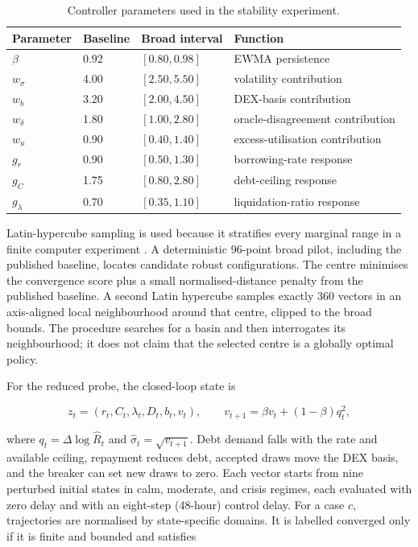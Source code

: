 \documentclass[sn-vancouver,Numbered]{sn-jnl}
\begin{document}
\begin{table}[t]
\centering
\caption{Controller parameters used in the stability experiment.}
\label{tab:stability-parameters}
\small
\begin{tabular}{llll}
\toprule
Parameter & Baseline & Broad interval & Function \\
\midrule
$\beta$ & 0.92 & $[0.80,0.98]$ & EWMA persistence \\
$w_\sigma$ & 4.00 & $[2.50,5.50]$ & volatility contribution \\
$w_b$ & 3.20 & $[2.00,4.50]$ & DEX-basis contribution \\
$w_\delta$ & 1.80 & $[1.00,2.80]$ & oracle-disagreement contribution \\
$w_u$ & 0.90 & $[0.40,1.40]$ & excess-utilisation contribution \\
$g_r$ & 0.90 & $[0.50,1.30]$ & borrowing-rate response \\
$g_C$ & 1.75 & $[0.80,2.80]$ & debt-ceiling response \\
$g_\lambda$ & 0.70 & $[0.35,1.10]$ & liquidation-ratio response \\
\bottomrule
\end{tabular}
\end{table}

Latin-hypercube sampling is used because it stratifies every marginal range in
a finite computer experiment \cite{McKay1979}. A deterministic 96-point broad
pilot, including the published baseline, locates candidate robust configurations.
The centre minimises the convergence score plus a small normalised-distance
penalty from the published baseline. A second Latin hypercube samples exactly
360 vectors in an axis-aligned local neighbourhood around that centre, clipped
to the broad bounds. The procedure searches for a basin and then interrogates
its neighbourhood; it does not claim that the selected centre is a globally
optimal policy.

For the reduced probe, the closed-loop state is

\begin{equation}
 z_t=(r_t,C_t,\lambda_t,D_t,b_t,v_t),
 \qquad
 v_{t+1}=\beta v_t+(1-\beta)q_t^2,
 \label{eq:reduced-state}
\end{equation}

where $q_t=\Delta\log\widehat R_t$ and $\widehat\sigma_t=\sqrt{v_{t+1}}$.
Debt demand falls with the rate and available ceiling, repayment reduces debt,
accepted draws move the DEX basis, and the breaker can set new draws to zero.
Each vector starts from nine perturbed initial states in calm, moderate, and
crisis regimes, each evaluated with zero delay and with an eight-step (48-hour)
control delay. For a case $c$, trajectories are normalised by state-specific
domains. It is labelled converged only if it is finite and bounded and satisfies
\end{document}
